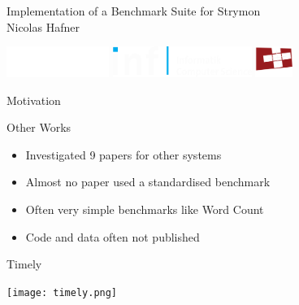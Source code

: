 \documentclass[14pt,t]{beamer}
\renewcommand{\title}[1]{
  {\huge #1} \vskip 0.4cm
}
\begin{document}
\begin{frame}[b]
  \begin{center}
    {\LARGE Implementation of a Benchmark Suite for Strymon} \\
    \vspace{0.5cm}
    Nicolas Hafner \\
    \vfill
    \hspace*{-1cm}\begin{minipage}{\pagewidth}
      \begin{center}
        \hspace{0.5cm}
        \includegraphics[height=1cm]{../systems-cover/ethlogo_white.pdf}
        \hfill
        \includegraphics[height=1cm]{../systems-cover/inf-logo_white.pdf}
        \hfill
        \includegraphics[height=1cm]{../systems-cover/systemslogo-3colour_white.pdf}
        \hspace*{0.5cm}
      \end{center}
    \end{minipage} 
  \end{center}
\end{frame}

\begin{frame}
  \title{Motivation}
\end{frame}

\begin{frame}
  \title{Other Works}
  \begin{itemize}
  \item Investigated 9 papers for other systems
  \item Almost no paper used a standardised benchmark
  \item Often very simple benchmarks like Word Count
  \item Code and data often not published
  \end{itemize}
\end{frame}

\begin{frame}
  \title{Timely}
  \texttt{[image: timely.png]}
\end{frame}
\end{document}

